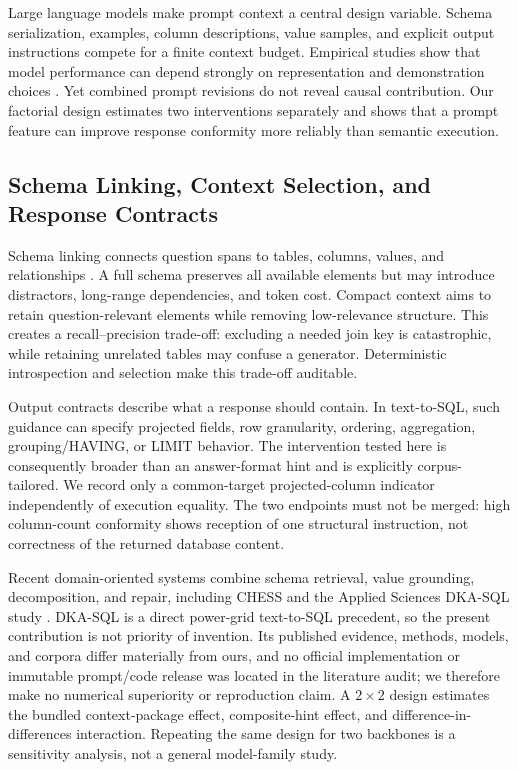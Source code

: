 \documentclass[applsci,article,submit,moreauthors]{Definitions/mdpi}
\begin{document}
Large language models make prompt context a central design variable. Schema serialization, examples, column descriptions, value samples, and explicit output instructions compete for a finite context budget. Empirical studies show that model performance can depend strongly on representation and demonstration choices \cite{nan2023enhancing,sun2023sqlprompt,pourreza2023dinsql}. Yet combined prompt revisions do not reveal causal contribution. Our factorial design estimates two interventions separately and shows that a prompt feature can improve response conformity more reliably than semantic execution.

\subsection{Schema Linking, Context Selection, and Response Contracts}
Schema linking connects question spans to tables, columns, values, and relationships \cite{wang2020ratsql,lei2020reexamining,liu2022semantic}. A full schema preserves all available elements but may introduce distractors, long-range dependencies, and token cost. Compact context aims to retain question-relevant elements while removing low-relevance structure. This creates a recall--precision trade-off: excluding a needed join key is catastrophic, while retaining unrelated tables may confuse a generator. Deterministic introspection and selection make this trade-off auditable.

Output contracts describe what a response should contain. In text-to-SQL, such guidance can specify projected fields, row granularity, ordering, aggregation, grouping/HAVING, or LIMIT behavior. The intervention tested here is consequently broader than an answer-format hint and is explicitly corpus-tailored. We record only a common-target projected-column indicator independently of execution equality. The two endpoints must not be merged: high column-count conformity shows reception of one structural instruction, not correctness of the returned database content.

Recent domain-oriented systems combine schema retrieval, value grounding, decomposition, and repair, including CHESS and the Applied Sciences DKA-SQL study \cite{talaei2024chess,bian2025dkasql}. DKA-SQL is a direct power-grid text-to-SQL precedent, so the present contribution is not priority of invention. Its published evidence, methods, models, and corpora differ materially from ours, and no official implementation or immutable prompt/code release was located in the literature audit; we therefore make no numerical superiority or reproduction claim. A $2\times2$ design estimates the bundled context-package effect, composite-hint effect, and difference-in-differences interaction. Repeating the same design for two backbones is a sensitivity analysis, not a general model-family study.
\end{document}
